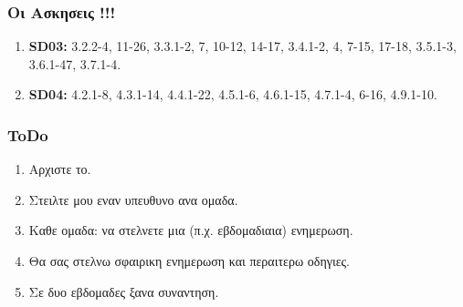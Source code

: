 \documentclass[xcolor={dvipsnames},t]{beamer}
\begin{document}
\begin{frame}
\frametitle{Οι Ασκησεις !!!}

\begin{enumerate}

\pause\item  \textbf{{\latintext  SD03:}}
3.2.2-4, 11-26,
3.3.1-2, 7, 10-12, 14-17,
3.4.1-2, 4, 7-15, 17-18,
3.5.1-3,
3.6.1-47,
3.7.1-4.

\pause\item  \textbf{{\latintext  SD04:}}
4.2.1-8,
4.3.1-14,
4.4.1-22,
4.5.1-6,
4.6.1-15,
4.7.1-4, 6-16,
4.9.1-10.

\end{enumerate}

\end{frame}
\begin{frame}
\frametitle{{\latintext  ToDo}}

\begin{enumerate}
\pause\item  Αρχιστε το.
\pause\item  Στειλτε μου εναν υπευθυνο ανα ομαδα.
\pause\item  Καθε ομαδα: να στελνετε μια (π.χ. εβδομαδιαια) ενημερωση.
\pause\item  Θα σας στελνω σφαιρικη ενημερωση και περαιτερω οδηγιες. 
\pause\item  Σε δυο εβδομαδες ξανα συναντηση. 
\end{enumerate}

\end{frame}
\begin{frame}
\end{frame}
\end{document}
